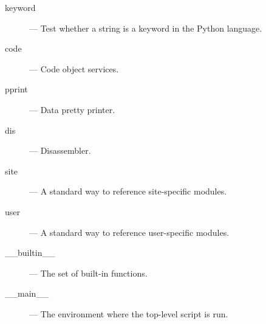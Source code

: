 \begin{description}
\item[keyword]
--- Test whether a string is a keyword in the Python language.

\item[code]
--- Code object services.

\item[pprint]
--- Data pretty printer.

\item[dis]
--- Disassembler.

\item[site]
--- A standard way to reference site-specific modules.

\item[user]
--- A standard way to reference user-specific modules.

\item[__builtin__]
--- The set of built-in functions.

\item[__main__]
--- The environment where the top-level script is run.

\end{description}
